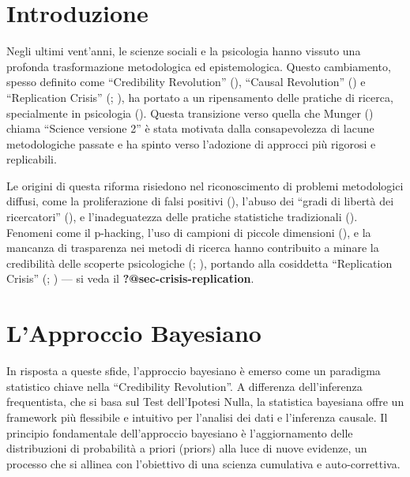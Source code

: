 \documentclass[
  letterpaper,
]{krantz}
\begin{document}
\section*{Introduzione}\label{introduzione-3}


Negli ultimi vent'anni, le scienze sociali e la psicologia hanno vissuto
una profonda trasformazione metodologica ed epistemologica. Questo
cambiamento, spesso definito come ``Credibility Revolution''
(),
``Causal Revolution'' () e ``Replication Crisis''
(;
), ha portato a
un ripensamento delle pratiche di ricerca, specialmente in psicologia
().
Questa transizione verso quella che Munger
() chiama ``Science versione 2''
è stata motivata dalla consapevolezza di lacune metodologiche passate e
ha spinto verso l'adozione di approcci più rigorosi e replicabili.

Le origini di questa riforma risiedono nel riconoscimento di problemi
metodologici diffusi, come la proliferazione di falsi positivi
(), l'abuso dei
``gradi di libertà dei ricercatori''
(), e
l'inadeguatezza delle pratiche statistiche tradizionali
(). Fenomeni
come il p-hacking, l'uso di campioni di piccole dimensioni
(), e la mancanza di
trasparenza nei metodi di ricerca hanno contribuito a minare la
credibilità delle scoperte psicologiche
(;
), portando alla cosiddetta
``Replication Crisis'' (;
) --- si veda il
\textbf{?@sec-crisis-replication}.

\section{L'Approccio Bayesiano}\label{lapproccio-bayesiano}

In risposta a queste sfide, l'approccio bayesiano è emerso come un
paradigma statistico chiave nella ``Credibility Revolution''. A
differenza dell'inferenza frequentista, che si basa sul Test
dell'Ipotesi Nulla, la statistica bayesiana offre un framework più
flessibile e intuitivo per l'analisi dei dati e l'inferenza causale. Il
principio fondamentale dell'approccio bayesiano è l'aggiornamento delle
distribuzioni di probabilità a priori (priors) alla luce di nuove
evidenze, un processo che si allinea con l'obiettivo di una scienza
cumulativa e auto-correttiva.
\end{document}
